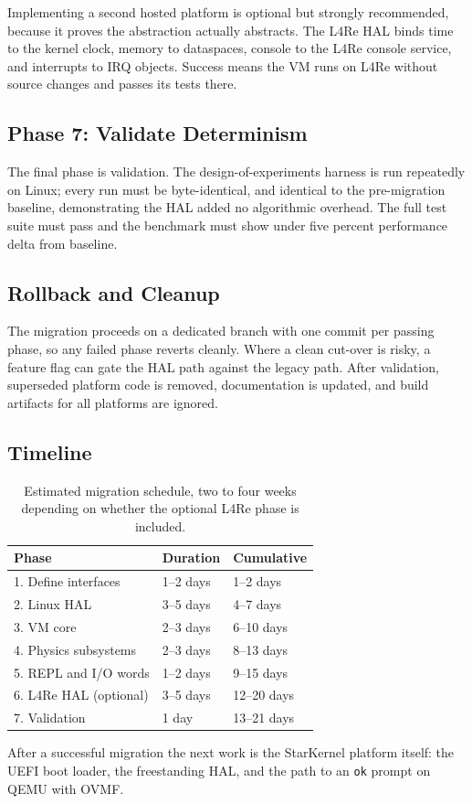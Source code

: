 Implementing a second hosted platform is optional but strongly recommended,
because it proves the abstraction actually abstracts. The L4Re HAL binds time to
the kernel clock, memory to dataspaces, console to the L4Re console service, and
interrupts to IRQ objects. Success means the VM runs on L4Re without source
changes and passes its tests there.

\subsection{Phase 7: Validate Determinism}

The final phase is validation. The design-of-experiments harness is run
repeatedly on Linux; every run must be byte-identical, and identical to the
pre-migration baseline, demonstrating the HAL added no algorithmic overhead. The
full test suite must pass and the benchmark must show under five percent
performance delta from baseline.

\subsection{Rollback and Cleanup}

The migration proceeds on a dedicated branch with one commit per passing phase,
so any failed phase reverts cleanly. Where a clean cut-over is risky, a feature
flag can gate the HAL path against the legacy path. After validation, superseded
platform code is removed, documentation is updated, and build artifacts for all
platforms are ignored.

\subsection{Timeline}

\begin{table}[h]
\centering
\begin{tabular}{lll}
\toprule
Phase & Duration & Cumulative \\
\midrule
1. Define interfaces      & 1--2 days & 1--2 days  \\
2. Linux HAL              & 3--5 days & 4--7 days  \\
3. VM core               & 2--3 days & 6--10 days \\
4. Physics subsystems    & 2--3 days & 8--13 days \\
5. REPL and I/O words    & 1--2 days & 9--15 days \\
6. L4Re HAL (optional)   & 3--5 days & 12--20 days \\
7. Validation            & 1 day     & 13--21 days \\
\bottomrule
\end{tabular}
\caption{Estimated migration schedule, two to four weeks depending on whether
the optional L4Re phase is included.}
\end{table}

After a successful migration the next work is the StarKernel platform itself: the
UEFI boot loader, the freestanding HAL, and the path to an \texttt{ok} prompt on
QEMU with OVMF.

